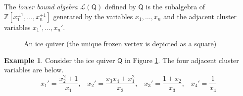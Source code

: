 \documentclass[10pt]{amsart}
\numberwithin{equation}{section}
\theoremstyle{definition}
\newtheorem{ex}[thm]{Example}
\theoremstyle{remark}
\renewcommand{\L}{\mathcal{L}}%
\newcommand{\1}{^{-1}}
\def\ZZ{\mathbb{Z}}
\def\Q{\mathsf{Q}}
\begin{document}
The \textit{lower bound algebra} $\L(\Q)$ defined by $\Q$ is the subalgebra of $\ZZ[x_1^{\pm1},\dots,x_n^{\pm1}]$ generated by the variables $x_1,\dots,x_n$ and the adjacent cluster variables $x_1',\dots,x_n'$.

\begin{figure}[h!t]
\caption{An ice quiver (the unique frozen vertex is depicted as a square)}
\label{fig: mutationexample}
\end{figure}

\begin{ex}
Consider the ice quiver $\Q$ in Figure \ref{fig: mutationexample}.  The four adjacent cluster variables are below.
\[ x_1' = \frac{x_2^2+1}{x_1},\;\;\; x_2'=\frac{x_3x_4+x_1^2}{x_2},\;\;\; x_3'=\frac{1+x_2}{x_3},\;\;\; x_4'=\frac{1}{x_4} \]
\end{ex}

%
\end{document}
